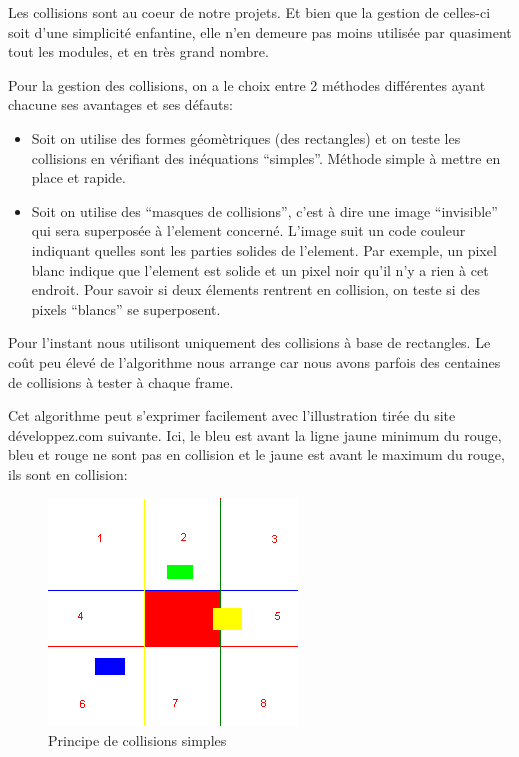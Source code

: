 \documentclass[a4paper, 12pt]{report}
\begin{document}
\noindent Les collisions sont au coeur de notre projets. Et bien que la
gestion de celles-ci soit d'une simplicité enfantine, elle n'en demeure pas
moins utilisée par quasiment tout les modules, et en très grand nombre.

Pour la gestion des collisions, on a le choix entre 2 méthodes différentes
ayant chacune ses avantages et ses défauts:
\begin{itemize}
    \item Soit on utilise des formes géomètriques (des rectangles) et on teste les collisions
        en vérifiant des inéquations ``simples''. Méthode simple à mettre en
        place et rapide.
    \item Soit on utilise des ``masques de collisions'', c'est à dire une image
        ``invisible'' qui sera superposée à l'element concerné. L'image suit un
        code couleur indiquant quelles sont les parties solides de l'element.
        Par exemple, un pixel blanc indique que l'element est solide et un
        pixel noir qu'il n'y a rien à cet endroit. Pour savoir si deux élements
        rentrent en collision, on teste si des pixels ``blancs'' se
        superposent.
\end{itemize}

Pour l'instant nous utilisont uniquement des collisions à base de rectangles.
Le coût peu élevé de l'algorithme nous arrange car nous avons parfois des
centaines de collisions à tester à chaque frame.


\noindent Cet algorithme peut s'exprimer facilement avec l'illustration tirée du
site développez.com suivante. Ici, le bleu est avant la ligne jaune minimum du
rouge, bleu et rouge ne sont pas en collision et le jaune est avant le maximum
du rouge, ils sont en collision:

\begin{figure}[!ht]
\centering
\includegraphics[scale= 0.8]{images/collision-boites.png}
\caption{Principe de collisions simples}
\end{figure}
\end{document}
